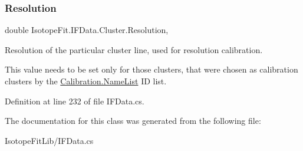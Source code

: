 \subsubsection{\texorpdfstring{Resolution}{Resolution}}
{\footnotesize\ttfamily double Isotope\+Fit.\+I\+F\+Data.\+Cluster.\+Resolution\hspace{0.3cm}{\ttfamily [get]}, {\ttfamily [set]}}



Resolution of the particular cluster line, used for resolution calibration. 

This value needs to be set only for those clusters, that were chosen as calibration clusters by the \hyperlink{class_isotope_fit_1_1_i_f_data_1_1_calibration_a2e347f087df878f22010302bda7db4be}{Calibration.\+Name\+List} ID list. 

Definition at line 232 of file I\+F\+Data.\+cs.



The documentation for this class was generated from the following file\+:\begin{DoxyCompactItemize}
\item 
Isotope\+Fit\+Lib/I\+F\+Data.\+cs\end{DoxyCompactItemize}
